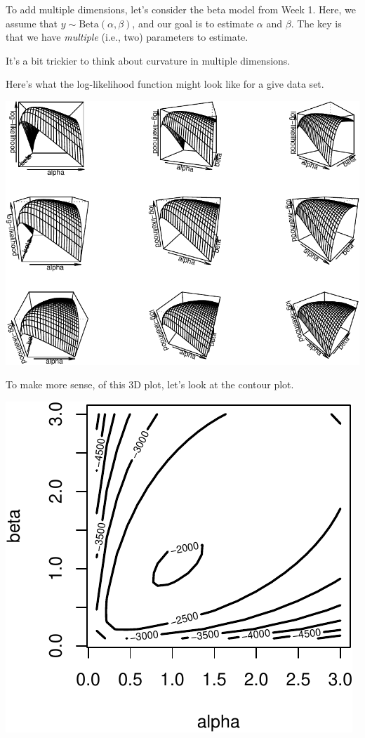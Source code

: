 \documentclass[
]{book}
\begin{document}
To add multiple dimensions, let's consider the beta model from Week 1.
Here, we assume that \(y \sim \text{Beta}(\alpha, \beta)\), and our goal
is to estimate \(\alpha\) and \(\beta\). The key is that we have
\emph{multiple} (i.e., two) parameters to estimate.

It's a bit trickier to think about curvature in multiple dimensions.

Here's what the log-likelihood function might look like for a give data
set.

\includegraphics{04-02-wald-cis_files/figure-latex/unnamed-chunk-3-1.pdf}

To make more sense, of this 3D plot, let's look at the contour plot.

\includegraphics{04-02-wald-cis_files/figure-latex/unnamed-chunk-4-1.pdf}
\end{document}
